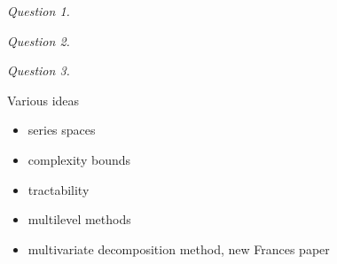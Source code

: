 \documentclass[graybox,footinfo]{svmult}
\begin{document}
\FJHLessonZero \FJHLessonTwoHalf


\begin{list}{}{\setlength\leftmargin{4.2ex}\setlength{}}
	\item[\emph{Question 1.}] \emph{\FJHQOne}
	
	\FJHLessonOne \FJHLessonTwo \FJHLessonThree \FJHLessonFive
	
	\item[\emph{Question 2.}] \emph{\FJHQTwo}
	
	\FJHLessonFour 
	
	\item[\emph{Question 3.}] \emph{\FJHQThree}
\end{list}

  




Various ideas
\begin{itemize}
\item series spaces
\item complexity bounds
\item tractability
\item multilevel methods
\item multivariate decomposition method, new Frances paper
\end{itemize}



\end{document}
